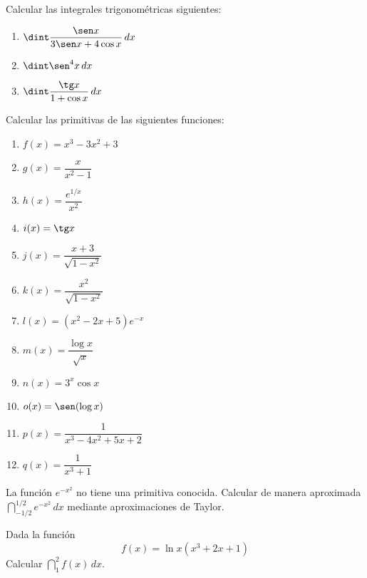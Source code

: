{Calcular las integrales trigonométricas siguientes:
\begin{multicols}{2}
\begin{enumerate}\setlength{\itemsep}{3mm}
\item $\dint \dfrac{\sen x}{3\sen x+4\cos x}\,dx$
\item $\dint \sen^{4}x\,dx$
\item $\dint \dfrac{\tg x}{1+\cos x}\,dx$ 
\end{enumerate}
\end{multicols}
}


{Calcular las primitivas de las siguientes funciones:
\begin{multicols}{2}
\begin{enumerate}\setlength{\itemsep}{3mm}
\item $f(x)=x^3-3x^2+3$
\item $g(x)=\dfrac{x}{x^2-1}$
\item $h(x)=\dfrac{e^{1/x}}{x^2}$
\item $i(x)=\tg x$
\item $j(x)=\dfrac{x+3}{\sqrt{1-x^2}}$
\item $k(x)=\dfrac{x^2}{\sqrt{1-x^2}}$
\item $l(x)=(x^2-2x+5)e^{-x}$
\item $m(x)=\dfrac{\log x}{\sqrt x}$
\item $n(x)=3^x\cos x$
\item $o(x)=\sen(\log x)$
\item $p(x)=\dfrac{1}{x^3-4x^2+5x+2}$
\item $q(x)=\dfrac{1}{x^3+1}$
\end{enumerate}
\end{multicols}
}


{La función $e^{-x^2}$ no tiene una primitiva conocida. Calcular de manera aproximada $\dint_{-1/2}^{1/2} e^{-x^2}\, dx$ mediante aproximaciones de Taylor.
}


{Dada la función
\[
f(x) = \ln x\left( {x^3  + 2x + 1} \right)
\]
Calcular $\dint_1^2 {f(x)\,dx}$.
}
